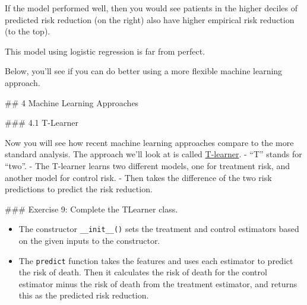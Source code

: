 \documentclass[11pt]{article}
\providecommand{\tightlist}{%
      \setlength{\itemsep}{0pt}\setlength{\parskip}{0pt}}
\begin{document}
    If the model performed well, then you would see patients in the higher
deciles of predicted risk reduction (on the right) also have higher
empirical risk reduction (to the top).

This model using logistic regression is far from perfect.

Below, you'll see if you can do better using a more flexible machine
learning approach.

     \#\# 4 Machine Learning Approaches

     \#\#\# 4.1 T-Learner

Now you will see how recent machine learning approaches compare to the
more standard analysis. The approach we'll look at is called
\href{https://arxiv.org/pdf/1706.03461.pdf}{T-learner}. - ``T'' stands
for ``two''. - The T-learner learns two different models, one for
treatment risk, and another model for control risk. - Then takes the
difference of the two risk predictions to predict the risk reduction.

     \#\#\# Exercise 9: Complete the TLearner class.

\begin{itemize}
\tightlist
\item
  The constructor \texttt{\_\_init\_\_()} sets the treatment and control
  estimators based on the given inputs to the constructor.
\item
  The \texttt{predict} function takes the features and uses each
  estimator to predict the risk of death. Then it calculates the risk of
  death for the control estimator minus the risk of death from the
  treatment estimator, and returns this as the predicted risk reduction.
\end{itemize}
\end{document}
